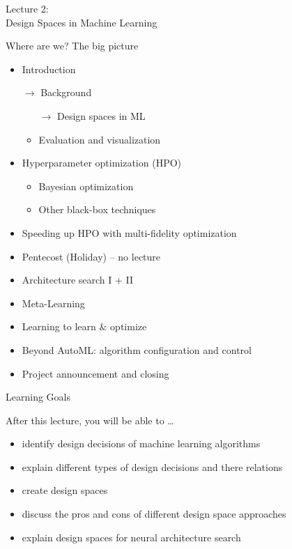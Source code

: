 \begin{frame}[c]{}

\centering
\huge
Lecture 2:\\
Design Spaces in Machine Learning
\end{frame}
\begin{frame}[c]{Where are we? The big picture}

\begin{itemize}
	\item Introduction
	\item[$\to$] Background
	\begin{itemize}
		\item[$\to$] Design spaces in ML
		\item Evaluation and visualization
	\end{itemize}
	\item Hyperparameter optimization (HPO)
	\begin{itemize}
	  \item Bayesian optimization
	  \item Other black-box techniques
	\end{itemize}
	\item Speeding up HPO with multi-fidelity optimization
	\item Pentecost (Holiday) -- no lecture
	\item Architecture search I + II
	\item Meta-Learning
	\item Learning to learn $\&$ optimize
	\item Beyond AutoML: algorithm configuration and control
	\item Project announcement and closing
\end{itemize}


\end{frame}
\begin{frame}[c]{Learning Goals}

After this lecture, you will be able to \ldots

\begin{itemize}
  \item identify design decisions of machine learning algorithms
  \item explain different types of design decisions and there relations
  \item create design spaces
  \item discuss the pros and cons of different design space approaches
  \item explain design spaces for neural architecture search
\end{itemize}

\end{frame}
